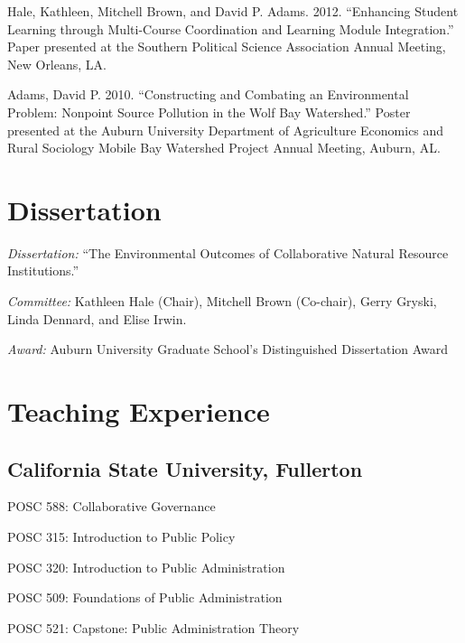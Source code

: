 \documentclass[12pt,letterpaper]{article}
\renewenvironment{itemize}{
  \begin{list}{}{
    \setlength{\leftmargin}{1.5em}
    \setlength{\itemsep}{0.25em}
    \setlength{\parskip}{0pt}
    \setlength{\parsep}{0.25em}
  }
}{
  \end{list}
}
\begin{document}
\begin{itemize}
    \item Hale, Kathleen, Mitchell Brown, and David P. Adams. 2012. ``Enhancing Student Learning through Multi-Course Coordination and Learning Module Integration.'' Paper presented at the Southern Political Science Association Annual Meeting, New Orleans, LA.
    
    \item Adams, David P. 2010. ``Constructing and Combating an Environmental Problem: Nonpoint Source Pollution in the Wolf Bay Watershed.'' Poster presented at the Auburn University Department of Agriculture Economics and Rural Sociology Mobile Bay Watershed Project Annual Meeting, Auburn, AL.
  \end{itemize}
  

\section*{Dissertation}
    \begin{itemize}\leftmargin=2pt\itemindent=-15pt\leftmargin=2pt\itemindent=-15pt
        \item \emph{Dissertation:} ``The Environmental Outcomes of Collaborative Natural Resource Institutions.'' 
        \item \emph{Committee:} Kathleen Hale (Chair), Mitchell Brown (Co-chair),
        Gerry Gryski, \\Linda Dennard, and Elise Irwin.
        \item \emph{Award:} Auburn University Graduate School's Distinguished Dissertation Award
    \end{itemize}
		
\section*{Teaching Experience}

\subsection*{California State University, Fullerton}
\begin{itemize}\leftmargin=2pt\itemindent=-15pt
  \item POSC 588: Collaborative Governance
  \item POSC 315: Introduction to Public Policy
  \item POSC 320: Introduction to Public Administration
  \item POSC 509: Foundations of Public Administration
  \item POSC 521: Capstone: Public Administration Theory
\end{itemize}
\end{document}
